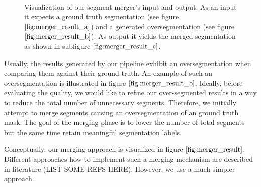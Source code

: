 \begin{figure}[H]
\begin{center}
~

\end{center}
\caption[Segmentation Merger]{Visualization of our segment merger's input and output. As an input it expects a ground truth segmentation (see figure $\ref{fig:merger_result_a}$) and a generated oversegmentation (see figure $\ref{fig:merger_result_b}$). As output it yields the merged segmentation as shown in subfigure $\ref{fig:merger_result_c}$.}
\label{fig:merger_result}
\end{figure}
Usually, the results generated by our pipeline exhibit an oversegmentation when comparing them against their ground truth. An example of such an oversegmentation is illustrated in figure $\ref{fig:merger_result_b}$. Ideally, before evaluating the quality, we would like to refine our over-segmented results in a way to reduce the total number of unnecessary segments. Therefore, we initially attempt to merge segments causing an oversegmentation of an ground truth mask. The goal of the merging phase is to lower the number of total segments but the same time retain meaningful segmentation labels. 

Conceptually, our merging approach is visualized in figure $\ref{fig:merger_result}$. Different approaches how to implement such a merging mechanism are described in literature (LIST SOME REFS HERE). However, we use a much simpler approach. 

